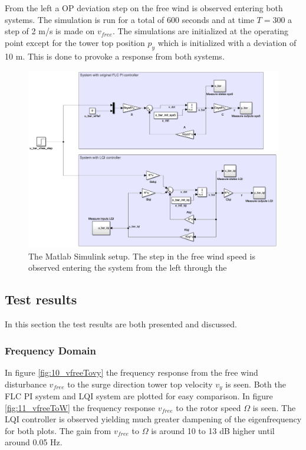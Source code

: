 From the left a OP deviation step on the free wind is observed entering both systems. The simulation is run for a total of 600 seconds and at time $ T = 300 $ a step of 2 m/s is made on $ v_{free} $. The simulations are initialized at the operating point except for the tower top position $ p_y $ which is initialized with a deviation of 10 m. This is done to provoke a response from both systems.
\begin{figure}[ht]
	\centering
	\includegraphics[width=0.95\linewidth]{Graphics/TestResults/linearModPerf/simulink_setup.png}
	\caption{The Matlab Simulink setup. The step in the free wind speed is observed entering the system from the left through the }
	\label{fig:simulink_setup}
\end{figure}


\subsection{Test results}
In this section the test results are both presented and discussed.

\subsubsection{Frequency Domain}
In figure \cref{fig:10_vfreeTovy} the frequency response from the free wind disturbance $ v_{free} $ to the surge direction tower top velocity $ v_y $ is seen. Both the FLC PI system and LQI system are plotted for easy comparison. In figure \cref{fig:11_vfreeToW} the frequency response $ v_{free} $ to the rotor speed $ \Omega $ is seen. The LQI controller is observed yielding much greater dampening of the eigenfrequency for both plots. The gain from $ v_{free} $ to $ \Omega $ is around 10 to 13 dB higher until around 0.05 Hz. 


